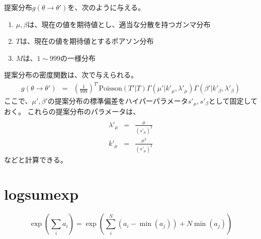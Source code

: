 \documentclass{jsarticle}
\newcommand{\numput}{T}
\newcommand{\maisu}{M}
\newcommand{\poisson}{\mathrm{Poisson}}
\newcommand{\meannumput}{\mu}
\newcommand{\ampeq}{&=&}
\newcommand{\weightsd}{\beta}
\newcommand{\gammak}{k}
\newcommand{\gammal}{\lambda}
\newcommand{\parsd}{s}
\begin{document}
提案分布$g(\theta\rightarrow\theta')$を、次のように与える。
\begin{enumerate}
 \item $\meannumput, \weightsd$は、現在の値を期待値とし、適当な分散を持つガンマ分布
 \item $\numput$は、現在の値を期待値とするポアソン分布
 \item $\maisu$は、$1\sim 999$の一様分布
\end{enumerate}

提案分布の密度関数は、次で与えられる。
\begin{eqnarray*}
 g(\theta\rightarrow\theta') \ampeq \left(\frac{1}{999}\right)^{\numput'} \poisson(\numput' | \numput) 
  \Gamma(\meannumput' | \gammak'_{\meannumput}, \gammal'_{\meannumput}) \Gamma(\weightsd' | \gammak'_{\weightsd}, \gammal'_{\weightsd})
\end{eqnarray*}
ここで、$\meannumput', \weightsd'$の提案分布の標準偏差をハイパーパラメータ$\parsd'_{\meannumput}, \parsd'_{\weightsd}$として固定しておく。
これらの提案分布のパラメータは、
\begin{eqnarray*}\\
 \gammal'_{\meannumput} \ampeq \frac{\meannumput}{(\parsd'_{\meannumput})^{2}} \\
 \gammak'_{\meannumput} \ampeq \frac{\meannumput^{2}}{(\parsd'_{\meannumput})^{2}}
\end{eqnarray*}
などと計算できる。

\section{logsumexp}
\[
 \exp(\sum_{i} a_{i}) = \exp(\sum_{i}^{N} (a_{i} - \min(a_{j})) + N\min (a_{j}))
\]
\end{document}
